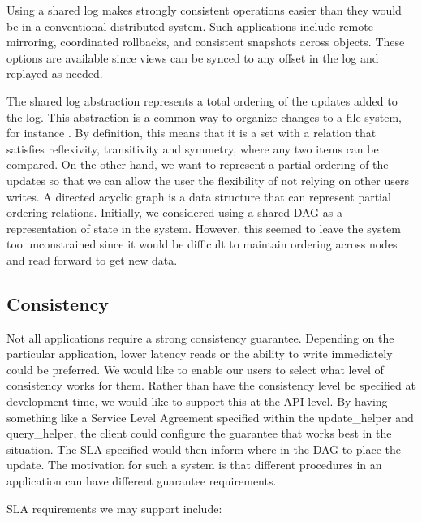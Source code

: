\documentclass[letterpaper,twocolumn,10pt]{article}
\begin{document}
Using a shared log makes strongly consistent operations easier than they would be in a conventional distributed system. Such applications include remote mirroring, coordinated rollbacks, and consistent snapshots across objects. These options are available since views can be synced to any offset in the log and replayed as needed.

The shared log abstraction represents a total ordering of the updates added to the log. This abstraction is a common way to organize changes to a file system, for instance \cite{Log}. By definition, this means that it is a set with a relation that satisfies reflexivity, transitivity and symmetry, where any two items can be compared. On the other hand, we want to represent a partial ordering of the updates so that we can allow the user the flexibility of not relying on other users writes. A directed acyclic graph is a data structure that can represent partial ordering relations. Initially, we considered using a shared DAG as a representation of state in the system. However, this seemed to leave the system too unconstrained since it would be difficult to maintain ordering across nodes and read forward to get new data. 

\subsection{Consistency}

Not all applications require a strong consistency guarantee. Depending on the particular application, lower latency reads or the ability to write immediately could be preferred. We would like to enable our users to select what level of consistency works for them. Rather than have the consistency level be specified at development time, we would like to support this at the API level. By having something like a Service Level Agreement specified within the update\_helper and query\_helper, the client could configure the guarantee that works best in the situation. The SLA specified would then inform where in the DAG to place the update. The motivation for such a system is that different procedures in an application can have different guarantee requirements.

SLA requirements we may support include: \cite{SLA}
\end{document}
